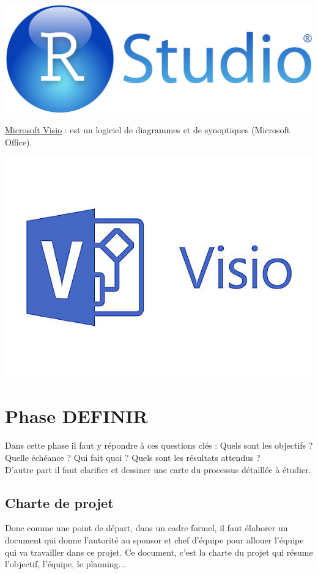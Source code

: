 \documentclass[12pt, a4paper]{thesis}
\begin{document}
\begin{center}
\includegraphics[scale=0.05]{rr.jpg}
\end{center}
\underline{Microsoft Visio} : est un logiciel de diagrammes et de synoptiques (Microsoft Office).
\begin{center}
    \includegraphics[scale=0.15]{visio.jpg}

\end{center}



\newpage
\section{Phase DEFINIR}
Dans cette phase il faut y répondre à ces questions clés : 
Quels sont les objectifs ?
Quelle échéance ?
Qui fait quoi ?
Quels sont les résultats attendus ?\\
D’autre part il faut clarifier et dessiner une carte du processus détaillée à étudier.

\subsection{Charte de projet}
Donc comme une point de départ, dans un cadre formel, il faut élaborer un document qui donne l'autorité au sponsor et chef d'équipe pour allouer l'équipe qui va travailler dans ce projet. Ce document, c'est la charte du projet qui résume l'objectif, l'équipe, le planning...
\end{document}
